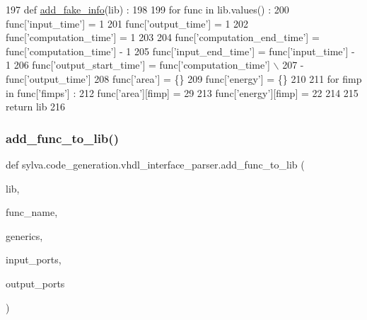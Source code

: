 \begin{DoxyCode}
197 \textcolor{keyword}{def }\hyperlink{namespacesylva_1_1code__generation_1_1vhdl__interface__parser_ac254ef348a92696ed564ed23a93249c7}{add\_fake\_info}(lib) :
198 
199   \textcolor{keywordflow}{for} func \textcolor{keywordflow}{in} lib.values() :
200     func[\textcolor{stringliteral}{'input\_time'}] = 1
201     func[\textcolor{stringliteral}{'output\_time'}] = 1
202     func[\textcolor{stringliteral}{'computation\_time'}] = 1
203 
204     func[\textcolor{stringliteral}{'computation\_end\_time'}] = func[\textcolor{stringliteral}{'computation\_time'}] - 1
205     func[\textcolor{stringliteral}{'input\_end\_time'}] = func[\textcolor{stringliteral}{'input\_time'}] - 1
206     func[\textcolor{stringliteral}{'output\_start\_time'}] = func[\textcolor{stringliteral}{'computation\_time'}] \(\backslash\)
207                               - func[\textcolor{stringliteral}{'output\_time'}]
208     func[\textcolor{stringliteral}{'area'}] = \{\}
209     func[\textcolor{stringliteral}{'energy'}] = \{\}
210 
211     \textcolor{keywordflow}{for} fimp \textcolor{keywordflow}{in} func[\textcolor{stringliteral}{'fimps'}] :
212       func[\textcolor{stringliteral}{'area'}][fimp] = 29
213       func[\textcolor{stringliteral}{'energy'}][fimp] = 22
214 
215   \textcolor{keywordflow}{return} lib
216 
\end{DoxyCode}
\mbox{\label{namespacesylva_1_1code__generation_1_1vhdl__interface__parser_a58b4385448eeafc249f2d5ca96664814}} 
\subsubsection{\texorpdfstring{add\+\_\+func\+\_\+to\+\_\+lib()}{add\_func\_to\_lib()}}
{\footnotesize\ttfamily def sylva.\+code\+\_\+generation.\+vhdl\+\_\+interface\+\_\+parser.\+add\+\_\+func\+\_\+to\+\_\+lib (\begin{DoxyParamCaption}\item[{}]{lib,  }\item[{}]{func\+\_\+name,  }\item[{}]{generics,  }\item[{}]{input\+\_\+ports,  }\item[{}]{output\+\_\+ports }\end{DoxyParamCaption})}



